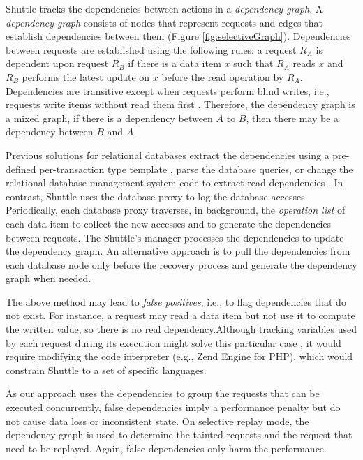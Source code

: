 Shuttle tracks the dependencies between actions in a \textit{dependency graph}. A \emph{dependency graph} consists of nodes that represent requests and edges that establish dependencies between them (Figure \ref{fig:selectiveGraph}).  Dependencies between requests are established using the following rules: a request $R_A$ is dependent upon request $R_B$ if there is a data item $x$ such that $R_A$ reads $x$ and $R_B$ performs the latest update on $x$ before the read operation by $R_A$. Dependencies are transitive except when requests perform blind writes, i.e., requests write items without read them first \cite{Ammann2002}. Therefore, the dependency graph is a mixed graph, if there is a dependency between $A$ to $B$, then there may be a dependency between $B$ and $A$.


Previous solutions for relational databases extract the dependencies using a pre-defined per-transaction type template  \cite{Ammann2002}, parse the database queries, or change the relational database management system code to extract read dependencies \cite{phoenix}. In contrast, Shuttle uses the database proxy to log the database accesses. Periodically, each database proxy traverses, in background, the \emph{operation list} of each data item to collect the new accesses and to generate the dependencies between requests. The Shuttle's manager processes the dependencies to update the dependency graph. An alternative approach is to pull the dependencies from each database node only before the recovery process and generate the dependency graph when needed. 


The above method may lead to \emph{false positives}, i.e., to flag dependencies that do not exist. For instance, a request may read a data item but not use it to compute the written value, so there is no real dependency.Although tracking variables used by each request during its execution might solve this particular case \cite{goel}, it would require modifying the code interpreter (e.g., Zend Engine for PHP), which would constrain Shuttle to a set of specific languages.

As our approach uses the dependencies to group the requests that can be executed concurrently, false dependencies imply a performance penalty but do not cause data loss or inconsistent state. On selective replay mode, the dependency graph is used to determine the tainted requests and the request that need to be replayed. Again, false dependencies only harm the performance.

